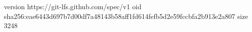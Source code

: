 version https://git-lfs.github.com/spec/v1
oid sha256:eae6443d697b7d00df7a48143b58aff1fd614fefb5d2e59fccbfa2b913e2a807
size 3248
